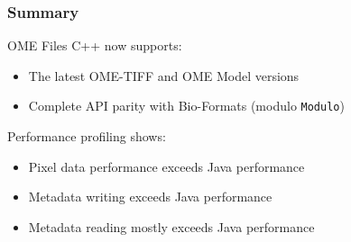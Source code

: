 \documentclass{beamer}
\begin{document}
\begin{frame}[fragile]
  \frametitle{Summary}

  OME Files C++ now supports:
  \begin{itemize}
  \item The latest OME-TIFF and OME Model versions
  \item Complete API parity with Bio-Formats (modulo \texttt{Modulo})
  \end{itemize}
  \bigskip
  Performance profiling shows:
  \begin{itemize}
  \item Pixel data performance exceeds Java performance
  \item Metadata writing exceeds Java performance
  \item Metadata reading mostly exceeds Java performance
  \end{itemize}
\end{frame}
\end{document}
